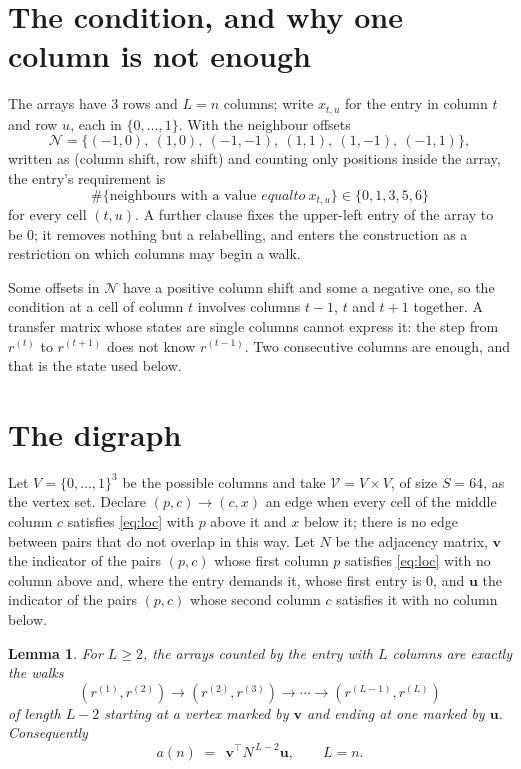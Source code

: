 \documentclass[11pt,a4paper]{article}
\theoremstyle{plain}
\newtheorem{lemma}[theorem]{Lemma}
\theoremstyle{definition}
\begin{document}
\section{The condition, and why one column is not enough}

The arrays have $3$ rows and $L=n$ columns; write $x_{t,u}$ for the entry in
column $t$ and row $u$, each in $\{0,\dots,1\}$. With the neighbour offsets
\[
\mathcal N=\{(-1,0),\ (1,0),\ (-1,-1),\ (1,1),\ (1,-1),\ (-1,1)\},
\]
written as (column shift, row shift) and counting only positions inside the array, the
entry's requirement is
\begin{equation}\label{eq:loc}
\#\{\text{neighbours with a value }equal to\ x_{t,u}\}\in\{0,1,3,5,6\}
\end{equation}
for every cell $(t,u)$. A further clause fixes the upper-left entry of the array to be $0$; it removes nothing but a relabelling, and enters the construction as a restriction on which columns may begin a walk.

Some offsets in $\mathcal N$ have a positive column shift and some a negative one, so the
condition at a cell of column $t$ involves columns $t-1$, $t$ and $t+1$ together. A transfer
matrix whose states are single columns cannot express it: the step from $r^{(t)}$ to
$r^{(t+1)}$ does not know $r^{(t-1)}$. Two consecutive columns are enough, and that is
the state used below.

\section{The digraph}

Let $V=\{0,\dots,1\}^{3}$ be the possible columns and take
$\mathcal V=V\times V$, of size $S=64$, as the vertex set. Declare $(p,c)\to(c,x)$ an edge
when every cell of the middle column $c$ satisfies \eqref{eq:loc} with $p$ above it and $x$
below it; there is no edge between pairs that do not overlap in this way. Let $N$ be the
adjacency matrix, $\mathbf{v}$ the indicator of the pairs $(p,c)$ whose first column $p$
satisfies \eqref{eq:loc} with no column above and, where the entry demands it, whose first entry is $0$, and $\mathbf{u}$ the indicator of
the pairs $(p,c)$ whose second column $c$ satisfies it with no column below.

\begin{lemma}\label{lem:walk}
For $L\ge2$, the arrays counted by the entry with $L$ columns are exactly the walks
\[
(r^{(1)},r^{(2)})\to(r^{(2)},r^{(3)})\to\cdots\to(r^{(L-1)},r^{(L)})
\]
of length $L-2$ starting at a vertex marked by $\mathbf{v}$ and ending at one marked by
$\mathbf{u}$. Consequently
\[
a(n)\;=\;\,\mathbf{v}^{\!\top}N^{\,L-2}\mathbf{u},\qquad L=n .
\]
\end{lemma}
\end{document}
